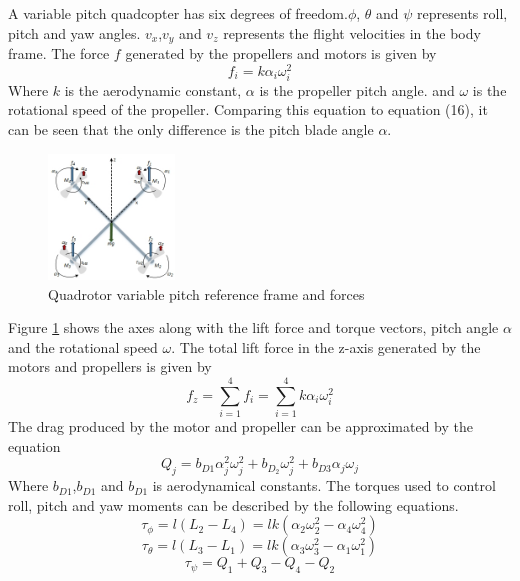 A variable pitch quadcopter has six degrees of freedom.$\phi$, $\theta$ and $\psi$ represents roll, pitch and yaw angles. $v_x$,$v_y$ and $v_z$ represents the flight velocities in the body frame. The force $f$ generated by the propellers and motors is given by
\begin{equation}
    f_{i} = k\alpha_i\omega_i^2
\end{equation}
Where $k$ is the aerodynamic constant,  $\alpha$ is the propeller pitch angle. and $\omega$ is the rotational speed of the propeller. Comparing this equation to equation (16), it can be seen that the only difference is the pitch blade angle $\alpha$.
\begin{figure}[H]
    \centering
    \includegraphics[width = 0.3\textwidth]{VAPIQ-PICTURES/MMVPQ.jpg}
    \caption{Quadrotor variable pitch reference frame and forces}
    \label{fig:ControllInputs}
\end{figure}
\noindent
Figure \ref{fig:ControllInputs} shows the axes along with the lift force and torque vectors, pitch angle $\alpha$ and the rotational speed $\omega$. The total lift force in the z-axis generated by the motors and propellers is given by
\begin{equation}
   f_{z} = \sum_{i=1}^{4} f_{i} = \sum_{i=1}^{4} k\alpha_i\omega_i^2
\end{equation}
The drag produced by the motor and propeller can be approximated by the equation
\begin{equation}
   Q_j = b_{D1}\alpha_j^2\omega_j^2 + b_D_2\omega_j^2 + b_{D3}\alpha_j\omega_j
\end{equation}
Where $b_{D1}$,$b_{D1}$ and $b_{D1}$ is aerodynamical constants. The torques used to control roll, pitch and yaw moments can be described by the following equations.
\begin{equation}
   \tau_\phi = l(L_2-L_4) =lk(\alpha_2\omega_2^2-\alpha_4\omega_4^2)
\end{equation}
\begin{equation}
   \tau_\theta = l(L_3-L_1) = lk(\alpha_3\omega_3^2-\alpha_1\omega_1^2)
\end{equation}
\begin{equation}
   \tau_\psi = Q_1 + Q_3 - Q_4 - Q_2
\end{equation}
